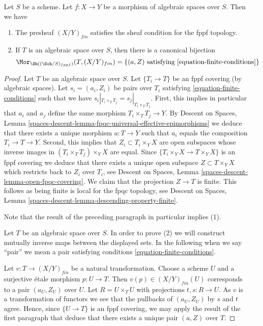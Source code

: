 \begin{lemma}
\label{lemma-finite-sheaf}
Let $S$ be a scheme.
Let $f : X \to Y$ be a morphism of algebraic spaces over $S$.
Then we have
\begin{enumerate}
\item The presheaf $(X/Y)_{fin}$ satisfies the sheaf condition for
the fppf topology.
\item If $T$ is an algebraic space over $S$, then there is a
canonical bijection
$$
\Mor_{\Sh((\Sch/S)_{fppf})}(T, (X/Y)_{fin})
=
\{(a, Z)\text{ satisfying \ref{equation-finite-conditions}}\}
$$
\end{enumerate}
\end{lemma}

\begin{proof}
Let $T$ be an algebraic space over $S$.
Let $\{T_i \to T\}$ be an fppf covering (by algebraic spaces).
Let $s_i = (a_i, Z_i)$ be pairs over $T_i$
satisfying \ref{equation-finite-conditions}
such that we have $s_i|_{T_i \times_T T_j} = s_j|_{T_i \times_T T_j}$.
First, this implies in particular that $a_i$ and $a_j$ define the same
morphism $T_i \times_T T_j \to Y$. By
Descent on Spaces,
Lemma \ref{spaces-descent-lemma-fpqc-universal-effective-epimorphisms}
we deduce that there exists a unique morphism $a : T \to Y$
such that $a_i$ equals the composition $T_i \to T \to Y$.
Second, this implies that $Z_i \subset T_i \times_Y X$ are open subspaces
whose inverse images in $(T_i \times_T T_j) \times_Y X$ are equal.
Since $\{T_i \times_Y X \to T \times_Y X\}$ is an fppf covering
we deduce that there exists a unique open subspace $Z \subset T \times_Y X$
which restricts back to $Z_i$ over $T_i$, see
Descent on Spaces, Lemma \ref{spaces-descent-lemma-open-fpqc-covering}.
We claim that the projection $Z \to T$ is finite.
This follows as being finite is local for the fpqc topology, see
Descent on Spaces, Lemma \ref{spaces-descent-lemma-descending-property-finite}.

\medskip\noindent
Note that the result of the preceding paragraph in particular implies (1).

\medskip\noindent
Let $T$ be an algebraic space over $S$. In order to prove (2) we will
construct mutually inverse maps between the displayed sets. In the
following when we say ``pair'' we mean a pair satisfying
conditions \ref{equation-finite-conditions}.

\medskip\noindent
Let $v : T \to (X/Y)_{fin}$ be a natural transformation.
Choose a scheme $U$ and a surjective \'etale morphism $p : U \to T$.
Then $v(p) \in (X/Y)_{fin}(U)$ corresponds to a pair $(a_U, Z_U)$
over $U$. Let $R = U \times_T U$ with projections $t, s : R \to U$.
As $v$ is a transformation of functors we see that the pullbacks of
$(a_U, Z_U)$ by $s$ and $t$ agree. Hence, since $\{U \to T\}$ is an
fppf covering, we may apply the result of the first paragraph that
deduce that there exists a unique pair $(a, Z)$ over $T$.


\end{proof}
